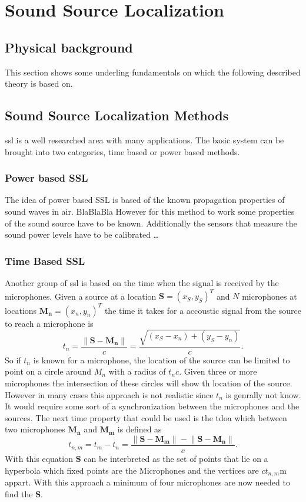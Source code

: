 \graphicspath{ {images/2_source_localization/} }
\chapter{Sound Source Localization}
\section{Physical background}
This section shows some underling fundamentals on which the following described theory is based on.

\section{Sound Source Localization Methods}
\acrfull{ssl}  is a well researched area with many applications.
\cite{nat_skript}
The basic system can be brought into two categories, time based or power based methods.
\subsection{Power based SSL}
The idea of power based SSL is based of the known propagation properties of sound waves in air.
BlaBlaBla 
However for this method to work some properties of the sound source have to be known.
Additionally the sensors that measure the sound power levels have to be calibrated \dots

\subsection{Time Based SSL}
Another group of \acrshort*{ssl} is based on the time when the
signal is received by the microphones.
Given a source at a location $\bm{S} = (x_S,y_S)^T$ and $N$ microphones at locations
$\bm{M_n} = (x_n,y_n)^T$ the time it takes for a accoustic signal from the source to reach a microphone is
\begin{equation}
  t_n = \frac{\lVert \bm{S} - \bm{M_n}\rVert}{c}
  = \frac{\sqrt{\left(x_S - x_n\right) + \left(y_S - y_n\right)}}{c} .
\end{equation}
So if $t_n$ is known for a microphone, the location of the source can be limited to point on a circle
around $M_n$ with a radius of $t_n c$.
Given three or more microphones the intersection of these circles will show th location of the source.
However in many cases this approach is not realistic since $t_n$ is genrally not know. 
It would require some sort of a synchronization between the microphones and the sources.
The next time property that could be used is the \acrfull{tdoa} which between 
two microphones $\bm{M_n}$ and $\bm{M_m}$ is defined as 
\begin{equation}
  t_{n, m} = t_m - t_n = \frac{\lVert \bm{S} - \bm{M_m}\rVert - \lVert \bm{S} - \bm{M_n}\rVert}{c}.
\end{equation}
With this equation $\bm{S}$ can be interbreted as the set of points that lie on a hyperbola
which fixed points are the Microphones and the vertices are $c t_{n,m}$m appart.
With this approach a minimum of four microphones are now needed to find the $\bm{S}$.


